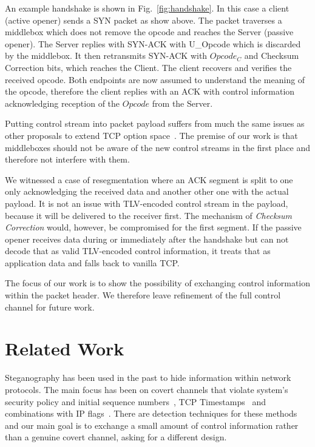 \documentclass{sig-alternate-10pt}
\begin{document}
An example handshake is shown in Fig.~\ref{fig:handshake}. In this case a client (active opener) sends a SYN packet as show above. The packet traverses a middlebox which does not remove the opcode and reaches the Server (passive opener). The Server replies with SYN-ACK with U\_Opcode which is discarded by the middlebox. It then retransmits SYN-ACK with $Opcode_C$ and Checksum Correction bits, which reaches the Client. The client recovers and verifies the received opcode. Both endpoints are now assumed to understand the meaning of the opcode, therefore the client replies with an ACK with control information acknowledging reception of the $Opcode$ from the Server.

Putting control stream into packet payload suffers from much the same issues as other proposals to extend TCP option space~\cite{Ramaiah:2012wa}. The premise of our work is that middleboxes should not be aware of the new control streams in the first place and therefore not interfere with them.

We witnessed a case of resegmentation where an ACK segment is split to one only acknowledging the received data and another other one with the actual payload. It is not an issue with TLV-encoded control stream in the payload, because it will be delivered to the receiver first. The mechanism of \emph{Checksum Correction} would, however, be compromised for the first segment. If the passive opener receives data during or immediately after the handshake but can not decode that as valid TLV-encoded control information, it treats that as application data and falls back to vanilla TCP.

The focus of our work is to show the possibility of exchanging control information within the packet header. We therefore leave refinement of the full control channel for future work.

\section{Related Work}
\label{sec:related}

Steganography has been used in the past to hide information within network protocols. The main focus has been on covert channels that violate system's security policy and initial sequence numbers~\cite{Rowland:1997vq}, TCP Timestamps~\cite{Giffin:2002wh} and combinations with IP flags~\cite{Murdoch:2005fz}. There are detection techniques for these methods and our main goal is to exchange a small amount of control information rather than a genuine covert channel, asking for a different design.
\end{document}
